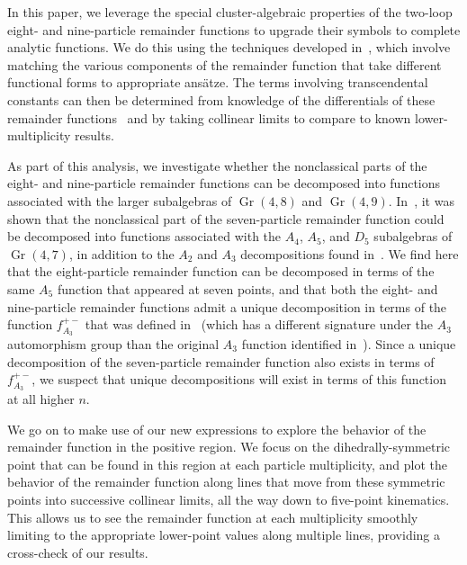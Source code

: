 \documentclass[11pt]{article}
\DeclareMathOperator{\Gr}{Gr}
\begin{document}
In this paper, we leverage the special cluster-algebraic properties of the two-loop eight- and nine-particle remainder functions to upgrade their symbols to complete analytic functions. We do this using the techniques developed in~\cite{Golden:2014xqa,Golden:2014xqf,Golden:2018gtk,Golden:2019kks}, which involve matching the various components of the remainder function that take different functional forms to appropriate ans\"atze. The terms involving transcendental constants can then be determined from knowledge of the differentials of these remainder functions~\cite{CaronHuot:2011ky,Golden:2013lha} and by taking collinear limits to compare to known lower-multiplicity results.

As part of this analysis, we investigate whether the nonclassical parts of the eight- and nine-particle remainder functions can be decomposed into functions associated with the larger subalgebras of $\Gr(4,8)$ and $\Gr(4,9)$. In~\cite{Golden:2018gtk}, it was shown that the nonclassical part of the seven-particle remainder function could be decomposed into functions associated with the $A_4$, $A_5$, and $D_5$ subalgebras of $\Gr(4,7)$, in addition to the $A_2$ and $A_3$ decompositions found in~\cite{Golden:2014xqa}. We find here that the eight-particle remainder function can be decomposed in terms of the same $A_5$ function that appeared at seven points, and that both the eight- and nine-particle remainder functions admit a unique decomposition in terms of the function $f_{A_3}^{+-}$ that was defined in~\cite{Golden:2014xqa} (which has a different signature under the $A_3$ automorphism group than the original $A_3$ function identified in~\cite{Golden:2014xqa}). Since a unique decomposition of the seven-particle remainder function also exists in terms of $f_{A_3}^{+-}$, we suspect that unique decompositions will exist in terms of this function at all higher $n$.

We go on to make use of our new expressions to explore the behavior of the remainder function in the positive region. We focus on the dihedrally-symmetric point that can be found in this region at each particle multiplicity, and plot the behavior of the remainder function along lines that move from these symmetric points into successive collinear limits, all the way down to five-point kinematics. This allows us to see the remainder function at each multiplicity smoothly limiting to the appropriate lower-point values along multiple lines, providing a cross-check of our results.
 
\end{document}
